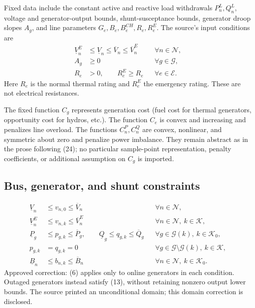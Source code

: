 \documentclass{article}
\begin{document}
Fixed data include the constant active and reactive load withdrawals $P_n^L,Q_n^L$, voltage and generator-output bounds, shunt-susceptance bounds, generator droop slopes $A_g$, and line parameters $G_e,B_e,B_e^{CH},R_e,R_e^E$. The source's input conditions are
\begin{align*}
\underline V_n^E&\leq\underline V_n\leq\overline V_n\leq\overline V_n^E
&&\forall n\in\mathcal N,\\
A_g&\geq0 &&\forall g\in\mathcal G,\\
R_e&>0,\qquad R_e^E\geq R_e &&\forall e\in\mathcal E.
\end{align*}
Here $R_e$ is the normal thermal rating and $R_e^E$ the emergency rating. These are not electrical resistances.

The fixed function $C_g$ represents generation cost (fuel cost for thermal generators, opportunity cost for hydros, etc.). The function $C_e$ is convex and increasing and penalizes line overload. The functions $C_n^P,C_n^Q$ are convex, nonlinear, and symmetric about zero and penalize power imbalance. They remain abstract as in the prose following (24); no particular sample-point representation, penalty coefficients, or additional assumption on $C_g$ is imported.

\subsection*{Bus, generator, and shunt constraints}
\begin{align}
\underline V_n&\leq v_{n,0}\leq\overline V_n
&&\forall n\in\mathcal N,\tag{4}\\
\underline V_n^E&\leq v_{n,k}\leq\overline V_n^E
&&\forall n\in\mathcal N,\ k\in\mathcal K,\tag{5}\\
\underline P_g&\leq p_{g,k}\leq\overline P_g,\qquad
\underline Q_g\leq q_{g,k}\leq\overline Q_g
&&\forall g\in\mathcal G(k),\ k\in\mathcal K_0,\tag{6}\\
p_{g,k}&=q_{g,k}=0
&&\forall g\in\mathcal G\setminus\mathcal G(k),\ k\in\mathcal K,\tag{13}\\
\underline B_n&\leq b_{n,k}\leq\overline B_n
&&\forall n\in\mathcal N,\ k\in\mathcal K_0.\tag{14}
\end{align}
Approved correction: (6) applies only to online generators in each condition. Outaged generators instead satisfy (13), without retaining nonzero output lower bounds. The source printed an unconditional domain; this domain correction is disclosed.
\end{document}
